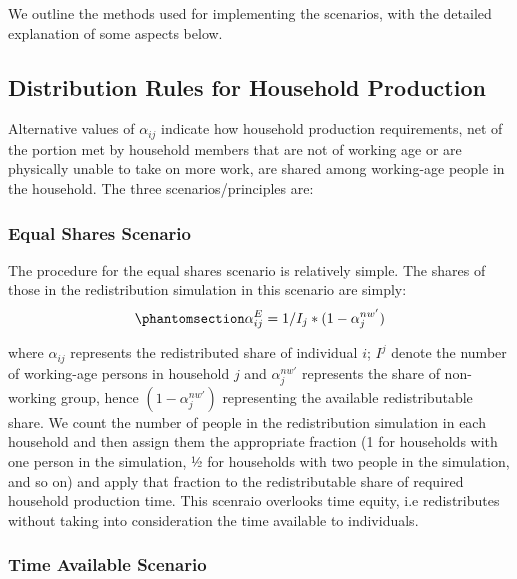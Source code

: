 \documentclass[
  11pt,
]{article}
\begin{document}
We outline the methods used for implementing the scenarios, with the
detailed explanation of some aspects below.

\subsection{Distribution Rules for Household
Production}\label{distribution-rules-for-household-production}

Alternative values of \(\alpha_{ij}\) indicate how household production
requirements, net of the portion met by household members that are not
of working age or are physically unable to take on more work, are shared
among working-age people in the household. The three
scenarios/principles are:

\subsubsection{Equal Shares Scenario}\label{equal-shares-scenario}

The procedure for the equal shares scenario is relatively simple. The
shares of those in the redistribution simulation in this scenario are
simply:
\begin{equation}\phantomsection\label{eq-r1}{\alpha_{ij}^E= 1/I_j*(1-\alpha_{j}^{nw'})
}\end{equation}

where \(\alpha_{ij}\) represents the redistributed share of individual
\(i\); \(I^j\) denote the number of working-age persons in household
\(j\) and \(\alpha_{j}^{nw'}\) represents the share of non-working
group, hence \((1-\alpha_{j}^{nw'})\) representing the available
redistributable share. We count the number of people in the
redistribution simulation in each household and then assign them the
appropriate fraction (1 for households with one person in the
simulation, 1⁄2 for households with two people in the simulation, and so
on) and apply that fraction to the redistributable share of required
household production time. This scenraio overlooks time equity, i.e
redistributes without taking into consideration the time available to
individuals.

\subsubsection{Time Available Scenario}\label{time-available-scenario}
\end{document}
